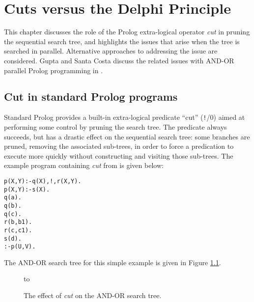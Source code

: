 \chapter{Cuts versus the Delphi Principle}
\label{cut}

This chapter discusses the role of the Prolog extra-logical
operator \textit{cut} in pruning the sequential search tree, and
highlights the issues that arise when the tree is searched in
parallel.  Alternative approaches to addressing the issue are
considered.  Gupta and Santa Costa discuss the related issues with AND-OR
parallel Prolog programming in \cite{GSC92}.

\section{Cut in standard Prolog programs} %
\enlargethispage{2\baselineskip} %

Standard Prolog \cite{DEDC96} provides a built-in extra-logical 
predicate ``cut'' (\texttt{!}/0) aimed at performing some control by
pruning the search tree.  The predicate always succeeds, but has
a drastic effect on the sequential search tree: some branches are
pruned, removing the associated sub-trees, in order to force a predication
to execute more quickly without constructing and visiting those
sub-trees.
The example program containing \textit{cut} from \cite{DEDC96} is
given below:

\begin{minipage}[h]{\textwidth}
\begin{alltt}
p(X,Y) :- q(X), !, r(X,Y).
p(X,Y) :- s(X).\vspace{2mm}
q(a).
q(b).
q(c).\vspace{2mm}
r(b,b1).
r(c,c1).\vspace{2mm}
s(d).\vspace{2mm}
:- p(U,V).
\end{alltt}
\end{minipage}

The AND-OR search tree for this simple example is given in
Figure \ref{cut_and_or_tree}.

\begin{figure}[htb]
\vspace{5mm} \hbox to 
\caption{The effect of \textit{cut} on the AND-OR search tree.}
\vspace{5mm}
\label{cut_and_or_tree}
\end{figure}

